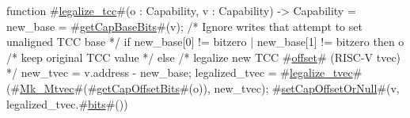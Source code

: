 function #\hyperref[sailRISCVzlegalizzezytcc]{legalize\_tcc}#(o : Capability, v : Capability) -> Capability = {
  new_base = #\hyperref[sailRISCVzgetCapBaseBits]{getCapBaseBits}#(v);
  /* Ignore writes that attempt to set unaligned TCC base */
  if new_base[0] != bitzero | new_base[1] != bitzero then
    o /* keep original TCC value */
  else {
    /* legalize new TCC #\hyperref[sailRISCVzoffset]{offset}# (RISC-V tvec) */
    new_tvec = v.address - new_base;
    legalized_tvec = #\hyperref[sailRISCVzlegalizzezytvec]{legalize\_tvec}#(#\hyperref[sailRISCVzMkzyMtvec]{Mk\_Mtvec}#(#\hyperref[sailRISCVzgetCapOffsetBits]{getCapOffsetBits}#(o)), new_tvec);
    #\hyperref[sailRISCVzsetCapOffsetOrNull]{setCapOffsetOrNull}#(v, legalized_tvec.#\hyperref[sailRISCVzbits]{bits}#())
  }
}
